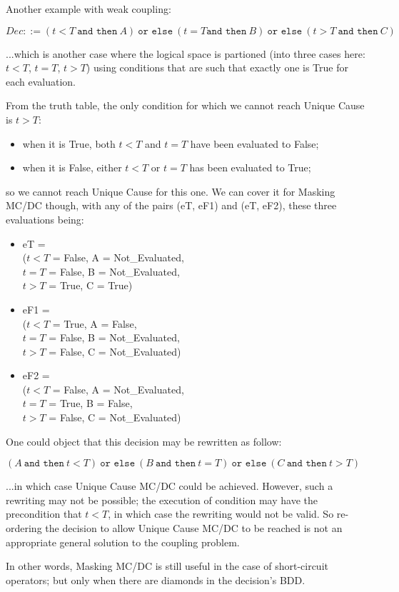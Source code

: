 \documentclass[a4paper,12pt,twoside]{article}
\newcommand{\andthen}{\texttt{and then}}
\newcommand{\orelse}{\texttt{or else}}
\begin{document}
Another example with weak coupling:

$Dec ::= (t < T \ \andthen{} \ A)
  \ \orelse{} \ (t = T \andthen{} \ B)
  \ \orelse{} \ (t > T \ \andthen{} \ C)$

...which is another case where the logical space is partioned (into three
cases here: $t < T$, $t = T$, $t > T$) using conditions that are such
that exactly one is True for each evaluation.

From the truth table, the only condition for which we cannot reach
Unique Cause is $t > T$:
\begin{itemize}
\item when it is True, both $t < T$ and $t = T$ have been evaluated to False;
\item when it is False, either $t < T$ or $t = T$ has been evaluated to True;
\end{itemize}
so we cannot reach Unique Cause for this one. We can cover it for
Masking MC/DC though, with any of the pairs (eT, eF1) and
(eT, eF2), these three evaluations being:
\begin{itemize}
\item eT = \\
($t < T$ = False, A = Not\_Evaluated,\\
 $t = T$ = False, B = Not\_Evaluated,\\
 $t > T$ = True,  C = True)

\item eF1 = \\
($t < T$ = True,  A = False,\\
 $t = T$ = False, B = Not\_Evaluated,\\
 $t > T$ = False, C = Not\_Evaluated)

\item eF2 = \\
($t < T$ = False, A = Not\_Evaluated,\\
 $t = T$ = True,  B = False,\\
 $t > T$ = False, C = Not\_Evaluated)
\end{itemize}

One could object that this decision may be rewritten as follow:

$(A \ \andthen{} \ t < T)
  \ \orelse{} \ (B \ \andthen{} \ t = T)
  \ \orelse{} \ (C \ \andthen{} \ t > T)$

...in which case Unique Cause MC/DC could be achieved. However, such a
rewriting may not be possible; the execution of condition may have the
precondition that $t < T$, in which case the rewriting would not be
valid. So re-ordering the decision to allow Unique Cause MC/DC to be
reached is not an appropriate general solution to the coupling
problem.

In other words, Masking MC/DC is still useful in the case of
short-circuit operators; but only when there are diamonds in the
decision's BDD.

\newpage


\end{document}
